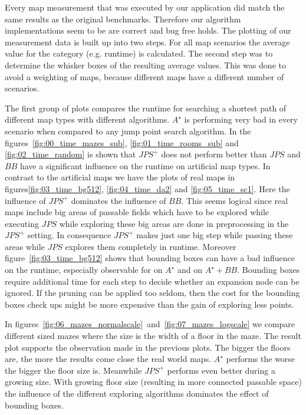 \documentclass{article}
\begin{document}
    Every map measurement that was executed by our application did match the same results as the original benchmarks. Therefore our algorithm implementations seem to be are correct and bug free holds. The plotting of our measurement data is built up into two steps. For all map scenarios the average value for the category (e.g. runtime) is calculated. The second step was to determine the whisker boxes of the resulting average values. This was done to avoid a weighting of maps, because different maps have a different number of scenarios.
    
    The first group of plots compares the runtime for searching a shortest path of different map types with different algorithms. $A^\star$ is performing very bad in every scenario when compared to any jump point search algorithm. In the figures~\ref{fig:00_time_mazes_sub}, \ref{fig:01_time_rooms_sub} and \ref{fig:02_time_random} is shown that $JPS^+$ does not perform better than $JPS$ and $BB$ have a significant influence on the runtime on artificial map types. In contrast to the artificial maps we have the plots of real maps in figures\ref{fig:03_time_bg512}, \ref{fig:04_time_da2} and \ref{fig:05_time_sc1}. Here the influence of $JPS^+$ dominates the influence of $BB$. This seems logical since real maps include big areas of passable fields which have to be explored while executing $JPS$ while exploring these big areas are done in preprocessing in the $JPS^+$ setting. In consequence $JPS^+$ makes just one big step while passing these areas while $JPS$ explores them completely in runtime. Moreover figure~\ref{fig:03_time_bg512} shows that bounding boxes can have a bad influence on the runtime, especially observable for on $A^\star$ and on $A^\star + BB$. Bounding boxes require additional time for each step to decide whether an expansion node can be ignored. If the pruning can be applied too seldom, then the cost for the bounding boxes check ups might be more expensive than the gain of exploring less points.
    
    In figures~\ref{fig:06_mazes_normalscale}~and~\ref{fig:07_mazes_logscale} we compare different sized mazes where the size is the width of a floor in the maze. The result plot supports the observation made in the previous plots. The bigger the floors are, the more the results come close the real world maps. $A^\star$ performs the worse the bigger the floor size is. Meanwhile $JPS^+$ performs even better during a growing size. With growing floor size (resulting in more connected passable space) the influence of the different exploring algorithms dominates the effect of bounding boxes.
    
\end{document}
